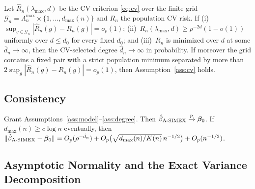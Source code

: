 \begin{lemma}\label{lem:cv}
Let $\widehat R_n(\lambda_{\max},d)$ be the CV criterion
\eqref{eq:cv} over the finite grid
$\mathcal G_n=\Lambda_n^{\max}\times\{1,\dots,d_{\max}(n)\}$ and
$R_n$ the population CV risk. If
(i)~$\sup_{g\in\mathcal G_n}|\widehat R_n(g)-R_n(g)|=o_p(1)$;
(ii)~$R_n(\lambda_{\max},d)\ge\rho^{-2d}(1-o(1))$ uniformly over
$d\le d_0$ for every fixed $d_0$; and (iii)~$R_n$ is minimized over
$d$ at some $\bar d_n\to\infty$, then the CV-selected degree
$\hat d_n\to\infty$ in probability. If moreover the grid contains a
fixed pair with a strict population minimum separated by more than
$2\sup_g|\widehat R_n(g)-R_n(g)|=o_p(1)$, then
Assumption~\ref{ass:cv} holds.
\end{lemma}

\subsection{Consistency}\label{sec:consistency}

\begin{theorem}\label{thm:cons}
Grant Assumptions~\ref{ass:model}--\ref{ass:degree}. Then
$\hat\beta_{\textup{A-SIMEX}}\xrightarrow{p}\bm{\beta}_0$. If
$d_{\max}(n)\ge c\log n$ eventually, then
$\|\hat\beta_{\textup{A-SIMEX}}-\bm{\beta}_0\|=O_p(\rho^{-\hat d_n})
+O_p\bigl(\sqrt{d_{\max}(n)/K(n)}\,n^{-1/2}\bigr)+O_p(n^{-1/2})$.
\end{theorem}

\subsection{Asymptotic Normality and the Exact Variance
Decomposition}\label{sec:an}

